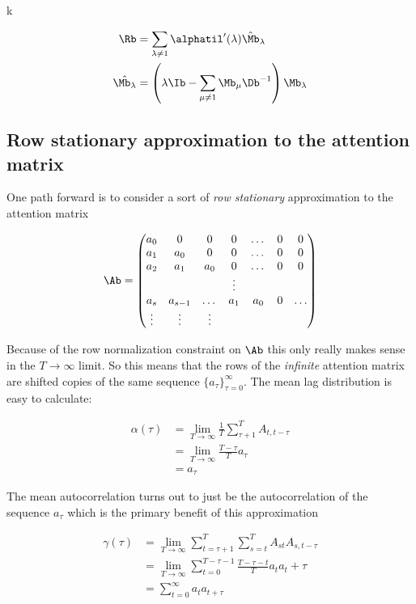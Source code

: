 k\documentclass{article}
\begin{document}
\begin{align}
     \Rb &= \sum_{\lambda \neq 1}\alphatil'(\lambda) \hat{\Mb}_\lambda \\
     \hat{\Mb_\lambda} &= \left(\lambda\Ib - \sum_{\mu\neq1}\Mb_\mu\Db^{-1}\right)\Mb_\lambda
\end{align}

 \subsection{Row stationary approximation to the attention matrix}
One path forward is to consider a sort of \textit{row stationary} approximation to the attention matrix

\begin{equation}\label{astat}
    \Ab = \begin{pmatrix}
        a_0 & 0 & 0 & 0 & \dots  &0 &0\\
        a_1 &a_0 & 0 & 0 & \dots  &0 &0\\
        a_2 &a_1 & a_0 & 0 & \dots  &0 &0\\
        &&&\vdots & \\
        a_s & a_{s-1} & \dots & a_1 & a_0  & 0 & \dots \\
        \vdots & \vdots &\vdots 
    \end{pmatrix}
\end{equation}

 Because of the row normalization constraint on $\Ab$ this only really makes sense in the $T \to \infty$ limit. So this means that the rows of the \textit{infinite} attention matrix are shifted copies of the same sequence $\{a_\tau\}_{\tau=0}^\infty$. The mean lag distribution is easy to calculate:

 \begin{align}
     \alpha(\tau)  &= \lim_{T\to \infty}\frac{1}{T}\sum_{\tau+1}^T A_{t, t-\tau} \\ 
     &= \lim_{T\to \infty}\frac{T - \tau}{T} a_\tau \\
     &= a_\tau
 \end{align}

The mean autocorrelation turns out to just be the autocorrelation of the sequence $a_\tau$ which is the primary benefit of this approximation 

\begin{align}
    \gamma(\tau) &= \lim_{T\to \infty}\sum_{t=\tau+1}^T\sum_{s=t}^T A_{st}A_{s,t-\tau} \\
    &= \lim_{T \to \infty}\sum_{t=0}^{T-\tau-1}\frac{T-\tau-t}{T}a_ta_t+\tau \\
    &= \sum_{t=0}^\infty a_t a_{t+\tau} \label{stat_gamma}
\end{align}
\end{document}
